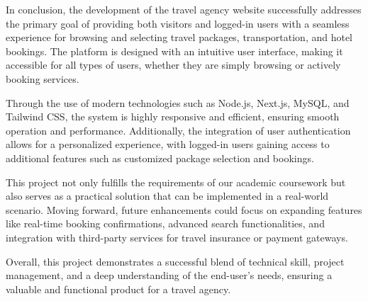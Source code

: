 \documentclass{scrreprt}
\begin{document}
In conclusion, the development of the travel agency website successfully addresses the primary goal of providing both visitors and logged-in users with a seamless experience for browsing and selecting travel packages, transportation, and hotel bookings. The platform is designed with an intuitive user interface, making it accessible for all types of users, whether they are simply browsing or actively booking services.

Through the use of modern technologies such as Node.js, Next.js, MySQL, and Tailwind CSS, the system is highly responsive and efficient, ensuring smooth operation and performance. Additionally, the integration of user authentication allows for a personalized experience, with logged-in users gaining access to additional features such as customized package selection and bookings.

This project not only fulfills the requirements of our academic coursework but also serves as a practical solution that can be implemented in a real-world scenario. Moving forward, future enhancements could focus on expanding features like real-time booking confirmations, advanced search functionalities, and integration with third-party services for travel insurance or payment gateways.

Overall, this project demonstrates a successful blend of technical skill, project management, and a deep understanding of the end-user's needs, ensuring a valuable and functional product for a travel agency.
\end{document}
